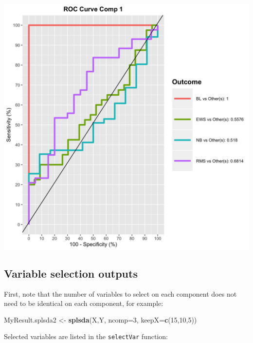 \documentclass[]{book}
\newenvironment{Shaded}{\begin{snugshade}}{\end{snugshade}}
\newcommand{\DataTypeTok}[1]{\textcolor[rgb]{0.13,0.29,0.53}{#1}}
\newcommand{\DecValTok}[1]{\textcolor[rgb]{0.00,0.00,0.81}{#1}}
\newcommand{\KeywordTok}[1]{\textcolor[rgb]{0.13,0.29,0.53}{\textbf{#1}}}
\newcommand{\NormalTok}[1]{#1}
\newcommand{\OperatorTok}[1]{\textcolor[rgb]{0.81,0.36,0.00}{\textbf{#1}}}
\newcommand{\StringTok}[1]{\textcolor[rgb]{0.31,0.60,0.02}{#1}}
\begin{document}
\begin{center}\includegraphics[width=0.75\linewidth,]{Figures/04-auroc-1} \end{center}

\hypertarget{variable-selection-outputs}{%
\subsection{Variable selection outputs}\label{variable-selection-outputs}}

First, note that the number of variables to select on each component does not need to be identical on each component, for example:

\begin{Shaded}
\begin{Highlighting}[]
\NormalTok{MyResult.splsda2 <-}\StringTok{ }\KeywordTok{splsda}\NormalTok{(X,Y, }\DataTypeTok{ncomp=}\DecValTok{3}\NormalTok{, }\DataTypeTok{keepX=}\KeywordTok{c}\NormalTok{(}\DecValTok{15}\NormalTok{,}\DecValTok{10}\NormalTok{,}\DecValTok{5}\NormalTok{))}
\end{Highlighting}
\end{Shaded}

Selected variables are listed in the \texttt{selectVar} function:

\begin{Shaded}
\end{Shaded}
\end{document}
